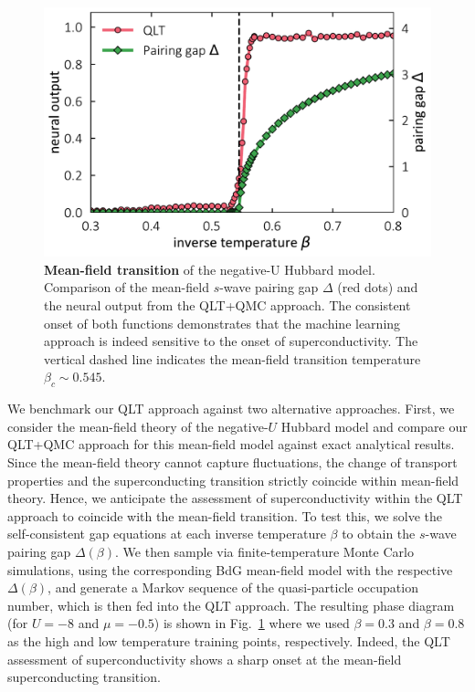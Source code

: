 \documentclass[amsmath,amssymb, aps, prx, longbibliography, twocolumn]{revtex4-1}
\begin{document}
\begin{figure}
\includegraphics[scale=.43]{fig2.pdf}
\caption{{\bf Mean-field transition} of the negative-U Hubbard model. 
		Comparison of the mean-field $s$-wave pairing gap $\Delta$ (red dots) 
		and the neural output from the QLT+QMC approach.
		The consistent onset of both functions demonstrates that the machine learning approach is indeed sensitive 
		to the onset of superconductivity. 
		The vertical dashed line indicates the mean-field transition temperature $\beta_c\sim 0.545$.}
		\label{fig:mlmft}
\end{figure}

We benchmark our QLT approach against two alternative approaches. 
First, we consider the mean-field theory of the negative-$U$ Hubbard model and compare our QLT+QMC approach for this
mean-field model against exact analytical results. Since the mean-field theory cannot capture fluctuations, the change of transport properties and the superconducting transition strictly coincide within mean-field theory. Hence, we anticipate the assessment of superconductivity within the QLT approach to coincide with the mean-field transition. To test this, we solve the self-consistent gap equations at  each inverse temperature $\beta$ to obtain the $s$-wave pairing gap $\Delta(\beta)$. We then sample via finite-temperature Monte Carlo simulations, using the corresponding BdG mean-field model with the respective $\Delta(\beta)$, and generate a Markov sequence of the quasi-particle occupation number, which is then fed into the QLT approach.
 The resulting phase diagram (for $U=-8$ and $\mu=-0.5$) is  shown in Fig.~\ref{fig:mlmft} where we used $\beta=0.3$ and $\beta=0.8$ as the high and low temperature training points, respectively. 
Indeed, the QLT assessment of superconductivity shows a sharp onset at the mean-field superconducting transition.
\end{document}
